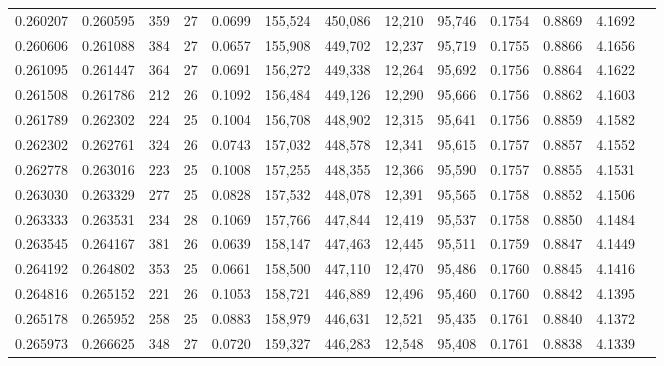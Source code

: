 \begin{tabular}{rrrrrrrrrrrrr}
0.260207 & 0.260595 &    359 &    27 &                                     0.0699 & 155,524 & 450,086 &  12,210 &  95,746 & 0.1754 & 0.8869 & 4.1692 \\
0.260606 & 0.261088 &    384 &    27 &                                     0.0657 & 155,908 & 449,702 &  12,237 &  95,719 & 0.1755 & 0.8866 & 4.1656 \\
0.261095 & 0.261447 &    364 &    27 &                                     0.0691 & 156,272 & 449,338 &  12,264 &  95,692 & 0.1756 & 0.8864 & 4.1622 \\
0.261508 & 0.261786 &    212 &    26 &                                     0.1092 & 156,484 & 449,126 &  12,290 &  95,666 & 0.1756 & 0.8862 & 4.1603 \\
0.261789 & 0.262302 &    224 &    25 &                                     0.1004 & 156,708 & 448,902 &  12,315 &  95,641 & 0.1756 & 0.8859 & 4.1582 \\
0.262302 & 0.262761 &    324 &    26 &                                     0.0743 & 157,032 & 448,578 &  12,341 &  95,615 & 0.1757 & 0.8857 & 4.1552 \\
0.262778 & 0.263016 &    223 &    25 &                                     0.1008 & 157,255 & 448,355 &  12,366 &  95,590 & 0.1757 & 0.8855 & 4.1531 \\
0.263030 & 0.263329 &    277 &    25 &                                     0.0828 & 157,532 & 448,078 &  12,391 &  95,565 & 0.1758 & 0.8852 & 4.1506 \\
0.263333 & 0.263531 &    234 &    28 &                                     0.1069 & 157,766 & 447,844 &  12,419 &  95,537 & 0.1758 & 0.8850 & 4.1484 \\
0.263545 & 0.264167 &    381 &    26 &                                     0.0639 & 158,147 & 447,463 &  12,445 &  95,511 & 0.1759 & 0.8847 & 4.1449 \\
0.264192 & 0.264802 &    353 &    25 &                                     0.0661 & 158,500 & 447,110 &  12,470 &  95,486 & 0.1760 & 0.8845 & 4.1416 \\
0.264816 & 0.265152 &    221 &    26 &                                     0.1053 & 158,721 & 446,889 &  12,496 &  95,460 & 0.1760 & 0.8842 & 4.1395 \\
0.265178 & 0.265952 &    258 &    25 &                                     0.0883 & 158,979 & 446,631 &  12,521 &  95,435 & 0.1761 & 0.8840 & 4.1372 \\
0.265973 & 0.266625 &    348 &    27 &                                     0.0720 & 159,327 & 446,283 &  12,548 &  95,408 & 0.1761 & 0.8838 & 4.1339 \\

\end{tabular}
